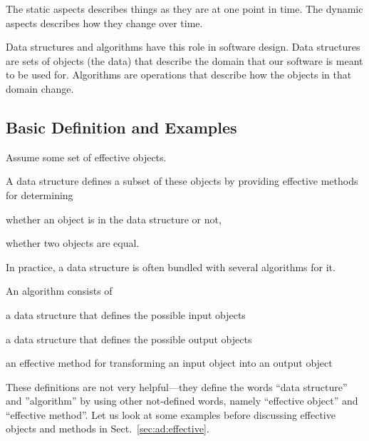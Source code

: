 The static aspects describes things as they are at one point in time.
The dynamic aspects describes how they change over time.

Data structures and algorithms have this role in software design.
Data structures are sets of objects (the data) that describe the domain that our software is meant to be used for.
Algorithms are operations that describe how the objects in that domain change.

\subsection{Basic Definition and Examples}\label{sec:ad:basicdef}

\begin{definition}\label{def:ad:ds}
Assume some set of effective objects.

A data structure defines a subset of these objects by providing effective methods for determining
\begin{compactitem}
 \item whether an object is in the data structure or not,
 \item whether two objects are equal.
\end{compactitem}
\medskip

In practice, a data structure is often bundled with several algorithms for it.
\end{definition}

\begin{definition}[Algorithm]\label{def:ad:algo}
An algorithm consists of
\begin{compactitem}
\item a data structure that defines the possible input objects
\item a data structure that defines the possible output objects
\item an effective method for transforming an input object into an output object
\end{compactitem}
\end{definition}

These definitions are not very helpful---they define the words ``data structure'' and ''algorithm'' by using other not-defined words, namely ``effective object'' and ``effective method''.
Let us look at some examples before discussing effective objects and methods in Sect.~\ref{sec:ad:effective}.

